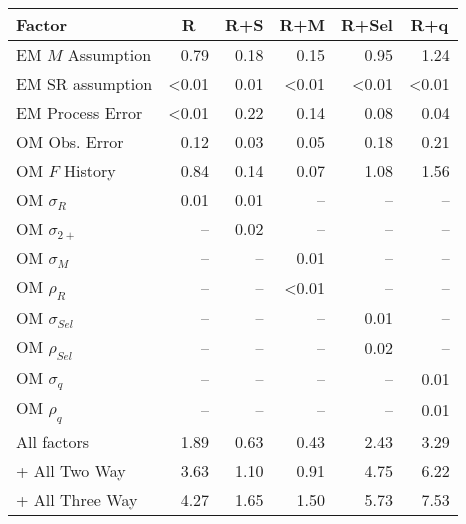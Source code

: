 \begin{center}
\begin{tabular}{lrrrrr}
\hline\hline
\multicolumn{1}{l}{Factor}&\multicolumn{1}{c}{R}&\multicolumn{1}{c}{R+S}&\multicolumn{1}{c}{R+M}&\multicolumn{1}{c}{R+Sel}&\multicolumn{1}{c}{R+q}\tabularnewline
\hline
EM $M$ Assumption&0.79&0.18&0.15&0.95&1.24\tabularnewline
EM SR assumption&\textless  0.01&0.01&\textless  0.01&\textless  0.01&\textless  0.01\tabularnewline
EM Process Error&\textless  0.01&0.22&0.14&0.08&0.04\tabularnewline
OM Obs. Error&0.12&0.03&0.05&0.18&0.21\tabularnewline
OM $F$ History&0.84&0.14&0.07&1.08&1.56\tabularnewline
OM $\sigma_R$&0.01&0.01&--&--&--\tabularnewline
OM $\sigma_{2+}$ &--&0.02&--&--&--\tabularnewline
OM $\sigma_M$&--&--&0.01&--&--\tabularnewline
OM $\rho_R$&--&--&\textless  0.01&--&--\tabularnewline
OM $\sigma_{Sel}$&--&--&--&0.01&--\tabularnewline
OM $\rho_{Sel}$&--&--&--&0.02&--\tabularnewline
OM $\sigma_q$&--&--&--&--&0.01\tabularnewline
OM $\rho_q$&--&--&--&--&0.01\tabularnewline
All factors&1.89&0.63&0.43&2.43&3.29\tabularnewline
+ All Two Way&3.63&1.10&0.91&4.75&6.22\tabularnewline
+ All Three Way&4.27&1.65&1.50&5.73&7.53\tabularnewline
\hline
\end{tabular}\end{center}
